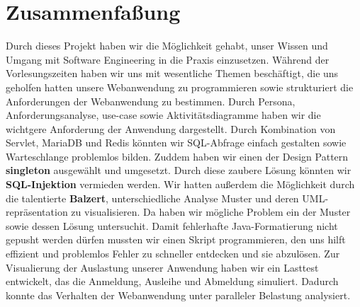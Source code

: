 \section{Zusammenfaßung}
Durch dieses Projekt haben wir die Möglichkeit gehabt, unser Wissen und Umgang mit Software Engineering in die Praxis einzusetzen. Während der Vorlesungszeiten haben wir uns mit wesentliche Themen beschäftigt, die uns geholfen hatten unsere Webanwendung zu programmieren sowie strukturiert die Anforderungen der Webanwendung zu bestimmen. Durch Persona, Anforderungsanalyse, use-case sowie Aktivitätsdiagramme haben wir die wichtgere Anforderung der Anwendung dargestellt. Durch Kombination von Servlet, MariaDB und Redis könnten wir SQL-Abfrage einfach gestalten sowie Warteschlange problemlos bilden.  Zuddem haben wir einen der Design Pattern \textbf{singleton} ausgewählt und umgesetzt. Durch diese zaubere Lösung könnten wir \textbf{SQL-Injektion} vermieden werden. Wir hatten außerdem die Möglichkeit durch die talentierte \textbf{Balzert}, unterschiedliche Analyse Muster und deren UML-repräsentation zu visualisieren. Da haben wir mögliche Problem ein der Muster sowie dessen Lösung untersuchit. Damit fehlerhafte Java-Formatierung nicht gepusht werden dürfen mussten wir einen Skript programmieren, den uns hilft effizient und problemlos Fehler zu schneller entdecken und sie abzulösen. Zur Visualierung der Auslastung unserer Anwendung haben wir ein Lasttest entwickelt, das die Anmeldung, Ausleihe und Abmeldung simuliert. Dadurch konnte das Verhalten der Webanwendung unter paralleler Belastung analysiert. 
